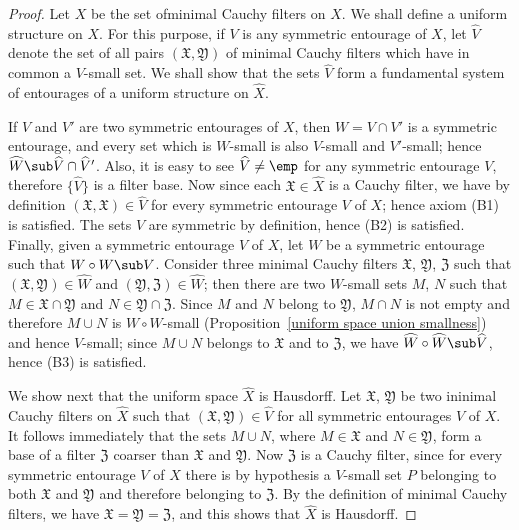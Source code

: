 \begin{proof}
Let $X$ be the set ofminimal Cauchy filters on $X$. We shall define a uniform structure on $X$. For this purpose, if $V$ is any symmetric entourage of $X$, let $\widehat{V}$ denote the set of all pairs $(\mathfrak{X},\mathfrak{Y})$ of minimal Cauchy filters which have in common a $V$-small set. We shall show that the sets $\widehat{V}$ form a fundamental system of entourages of a uniform structure on $\widehat{X}$.\par
If $V$ and $V'$ are two symmetric entourages of $X$, then $W=V\cap V'$ is a symmetric entourage, and every set which is $W$-small is also $V$-small and $V'$-small; hence $\widehat{W}\sub\widehat{V}\cap\widehat{V}'$. Also, it is easy to see $\widehat{V}\neq\emp$ for any symmetric entourage $V$, therefore $\{\widehat{V}\}$ is a filter base. Now since each $\mathfrak{X}\in\widehat{X}$ is a Cauchy filter, we have by definition $(\mathfrak{X},\mathfrak{X})\in\widehat{V}$ for every symmetric entourage $V$ of $X$; hence axiom (B1) is satisfied. The sets $V$ are symmetric by definition, hence (B2) is satisfied. Finally, given a symmetric entourage $V$ of $X$, let $W$ be a symmetric entourage such that $W\circ W\sub V$. Consider three minimal Cauchy filters $\mathfrak{X}$, $\mathfrak{Y}$, $\mathfrak{Z}$ such that $(\mathfrak{X},\mathfrak{Y})\in\widehat{W}$ and $(\mathfrak{Y},\mathfrak{Z})\in\widehat{W}$; then there are two $W$-small sets $M$, $N$ such that $M\in\mathfrak{X}\cap\mathfrak{Y}$ and $N\in\mathfrak{Y}\cap\mathfrak{Z}$. Since $M$ and $N$ belong to $\mathfrak{Y}$, $M\cap N$ is not empty and therefore $M\cup N$ is $W\circ W$-small (Proposition~\ref{uniform space union smallness}) and hence $V$-small; since $M\cup N$ belongs to $\mathfrak{X}$ and to $\mathfrak{Z}$, we have $\widehat{W}\circ\widehat{W}\sub\widehat{V}$, hence (B3) is satisfied.\par
We show next that the uniform space $\widehat{X}$ is Hausdorff. Let $\mathfrak{X}$, $\mathfrak{Y}$ be two ininimal Cauchy filters on $\widehat{X}$ such that $(\mathfrak{X},\mathfrak{Y})\in\widehat{V}$ for all symmetric entourages $V$ of $X$. It follows immediately that the sets $M\cup N$, where $M\in\mathfrak{X}$ and $N\in\mathfrak{Y}$, form a base of a filter $\mathfrak{Z}$ coarser than $\mathfrak{X}$ and $\mathfrak{Y}$. Now $\mathfrak{Z}$ is a Cauchy filter, since for every symmetric entourage $V$ of $X$ there is by hypothesis a $V$-small set $P$ belonging to both $\mathfrak{X}$ and $\mathfrak{Y}$ and therefore belonging to $\mathfrak{Z}$. By the definition of minimal Cauchy filters, we have $\mathfrak{X}=\mathfrak{Y}=\mathfrak{Z}$, and this shows that $\widehat{X}$ is Hausdorff.\par

\end{proof}
